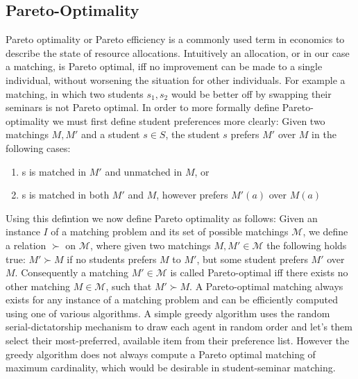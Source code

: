 \subsection{Pareto-Optimality}
Pareto optimality or Pareto efficiency is a commonly used term in economics to describe the state of resource allocations. Intuitively an allocation, or in our case a matching, is Pareto optimal, iff no improvement can be made to a single individual, without worsening the situation for other individuals. For example a matching, in which two students $s_1, s_2$ would be better off by swapping their seminars is not Pareto optimal.
In order to more formally define Pareto-optimality we must first define student preferences more clearly: 
\newline
Given two matchings $M, M'$ and a student $s \in S$, the student $s$ prefers $M'$ over $M$ in the following cases:
\begin{enumerate}
    \item s is matched in $M'$ and unmatched in $M$, or
    \item s is matched in both $M'$ and $M$, however prefers $M'(a)$ over $M(a)$
\end{enumerate}
Using this defintion we now define Pareto optimality as follows: Given an instance $I$ of a matching problem and its set of possible matchings $\mathcal{M}$, we define a relation $\succ$ on $\mathcal{M}$, where given two matchings $M, M' \in \mathcal{M}$ the following holds true: $M' \succ M$ if no students prefers $M$ to $M'$, but some student prefers $M'$ over $M$. Consequently a matching $M' \in \mathcal{M}$ is called Pareto-optimal iff there exists no other matching $M \in \mathcal{M}$, such that $M' \succ M$.\cite{algorithmics}
A Pareto-optimal matching always exists for any instance of a matching problem and can be efficiently computed using one of various algorithms. A simple greedy algorithm uses the random serial-dictatorship mechanism to draw each agent in random order and let's them select their most-preferred, available item from their preference list.\cite{RothTwoSided, SerialDictatorship} However the greedy algorithm does not always compute a Pareto optimal matching of maximum cardinality, which would be desirable in student-seminar matching.\cite{Abraham:Pacha}

